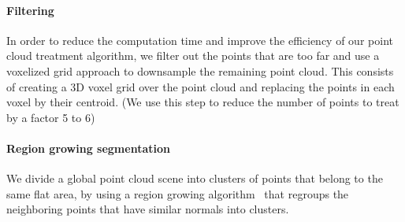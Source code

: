 \paragraph{Filtering}
In order to reduce the computation time and improve the efficiency of our point cloud treatment algorithm, we filter out the points that are too far and use a voxelized grid approach to downsample the remaining point cloud.
This consists of creating a 3D voxel grid over the point cloud and replacing the points in each voxel by their centroid.
(We use this step to reduce the number of points to treat by a factor 5 to 6)



\paragraph{Region growing segmentation}
We divide a global point cloud scene into clusters of points that belong to the same flat area, by using a region growing algorithm~\cite{poppinga:iros:2008} that regroups the neighboring points that have similar normals into clusters.

